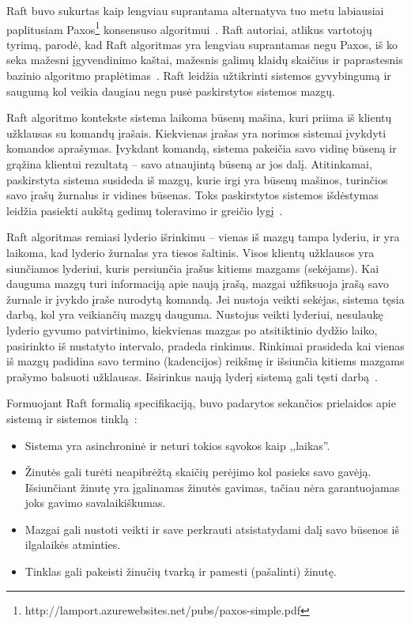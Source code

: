 \documentclass{VUMIFPSkursinis}
\begin{document}
Raft buvo sukurtas kaip lengviau suprantama alternatyva tuo metu labiausiai paplitusiam Paxos\footnote{http://lamport.azurewebsites.net/pubs/paxos-simple.pdf} konsensuso algoritmui~\cite{ongaro_consensus, diego_designing_2016}. Raft autoriai, atlikus vartotojų tyrimą, parodė, kad Raft algoritmas yra lengviau suprantamas negu Paxos, iš ko seka mažesni įgyvendinimo kaštai, mažesnis galimų klaidų skaičius ir paprastesnis bazinio algoritmo praplėtimas~\cite{ongaro_consensus}. Raft leidžia užtikrinti sistemos gyvybingumą ir saugumą kol veikia daugiau negu pusė paskirstytos sistemos mazgų. 

Raft algoritmo kontekste sistema laikoma būsenų mašina, kuri priima iš klientų užklausas su komandų įrašais. Kiekvienas įrašas yra norimos sistemai įvykdyti komandos aprašymas. Įvykdant komandą, sistema pakeičia savo vidinę būseną ir grąžina klientui rezultatą -- savo atnaujintą būseną ar jos dalį. Atitinkamai, paskirstyta sistema susideda iš mazgų, kurie irgi yra būsenų mašinos, turinčios savo įrašų žurnalus ir vidines būsenas. Toks paskirstytos sistemos išdėstymas leidžia pasiekti aukštą gedimų toleravimo ir greičio lygį~\cite{ongaro_consensus, steen_distributed_2017}.

Raft algoritmas remiasi lyderio išrinkimu -- vienas iš mazgų tampa lyderiu, ir yra laikoma, kad lyderio žurnalas yra tiesos šaltinis. Visos klientų užklausos yra siunčiamos lyderiui, kuris persiunčia įrašus kitiems mazgams (sekėjams). Kai dauguma mazgų turi informaciją apie naują įrašą, mazgai užfiksuoja įrašą savo žurnale ir įvykdo įraše nurodytą komandą. Jei nustoja veikti sekėjas, sistema tęsia darbą, kol yra veikiančių mazgų dauguma. Nustojus veikti lyderiui, nesulaukę lyderio gyvumo patvirtinimo, kiekvienas mazgas po atsitiktinio dydžio laiko, pasirinkto iš nustatyto intervalo, pradeda rinkimus. Rinkimai prasideda kai vienas iš mazgų padidina savo termino (kadencijos) reikšmę ir išsiunčia kitiems mazgams prašymo balsuoti užklausas. Išsirinkus naują lyderį sistemą gali tęsti darbą~\cite{ongaro_consensus}. 

Formuojant Raft formalią specifikaciją, buvo padarytos sekančios prielaidos apie sistemą ir sistemos tinklą~\cite{ongaro_consensus}:
\begin{itemize}
\item Sistema yra asinchroninė ir neturi tokios sąvokos kaip ,,laikas''.
\item Žinutės gali turėti neapibrėžtą skaičių perėjimo kol pasieks savo gavėją. Išsiunčiant žinutę yra įgalinamas žinutės gavimas, tačiau nėra garantuojamas joks gavimo savalaikiškumas.
\item Mazgai gali nustoti veikti ir save perkrauti atsistatydami dalį savo būsenos iš ilgalaikės atminties.
\item Tinklas gali pakeisti žinučių tvarką ir pamesti (pašalinti) žinutę. 
\end{itemize}
\end{document}
